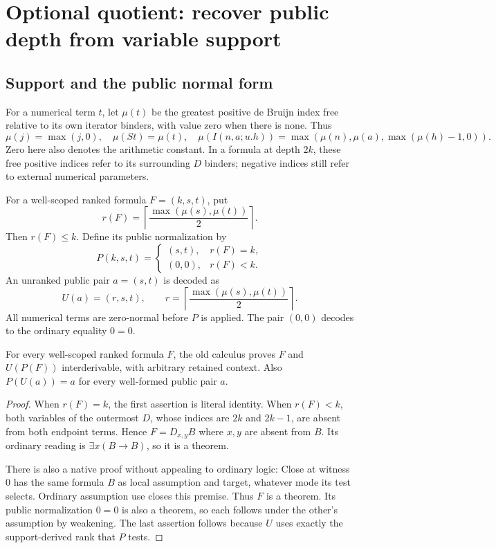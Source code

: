 \section{Optional quotient: recover public depth from variable support}

\subsection{Support and the public normal form}
For a numerical term \(t\), let \(\mu(t)\) be the greatest positive
de Bruijn index free relative to its own iterator binders, with value
zero when there is none. Thus
\[
 \mu(j)=\max(j,0),\quad
 \mu(St)=\mu(t),\quad
 \mu(I(n,a;u.h))=\max(\mu(n),\mu(a),\max(\mu(h)-1,0)).
\]
Zero here also denotes the arithmetic constant. In a formula at depth
\(2k\), these free positive indices refer to its surrounding \(D\)
binders; negative indices still refer to external numerical parameters.

For a well-scoped ranked formula \(F=(k,s,t)\), put
\[
 r(F)=\left\lceil\frac{\max(\mu(s),\mu(t))}{2}\right\rceil.
\]
Then \(r(F)\leq k\). Define its public normalization by
\[
 P(k,s,t)=
 \begin{cases}
 (s,t),&r(F)=k,\\
 (0,0),&r(F)<k.
 \end{cases}
\]
An unranked public pair \(a=(s,t)\) is decoded as
\[
 U(a)=(r,s,t),\qquad
 r=\left\lceil\frac{\max(\mu(s),\mu(t))}{2}\right\rceil.
\]
All numerical terms are zero-normal before \(P\) is applied. The pair
\((0,0)\) decodes to the ordinary equality \(0=0\).

\begin{lemma}
For every well-scoped ranked formula \(F\), the old calculus proves
\(F\) and \(U(P(F))\) interderivable, with arbitrary retained context.
Also \(P(U(a))=a\) for every well-formed public pair \(a\).
\end{lemma}
\begin{proof}
When \(r(F)=k\), the first assertion is literal identity.
When \(r(F)<k\), both variables of the outermost \(D\), whose indices
are \(2k\) and \(2k-1\), are absent from both endpoint terms.
Hence \(F=D_{x,y}B\) where \(x,y\) are absent from \(B\).
Its ordinary reading is \(\exists x(B\to B)\), so it is a theorem.

There is also a native proof without appealing to ordinary logic:
Close at witness \(0\) has the same formula \(B\) as local assumption
and target, whatever mode its test selects. Ordinary assumption use
closes this premise. Thus \(F\) is a theorem. Its public normalization
\(0=0\) is also a theorem, so each follows under the other's assumption
by weakening. The last assertion follows because \(U\) uses exactly
the support-derived rank that \(P\) tests.
\end{proof}

